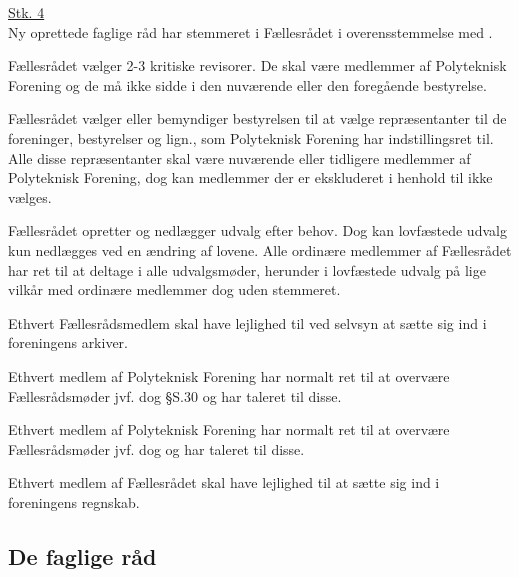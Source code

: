 \begin{list}
\underline{Stk. 4}\\
Ny oprettede faglige råd har stemmeret i Fællesrådet i overensstemmelse med .

\item Fællesrådet vælger 2-3 kritiske revisorer. De skal være medlemmer af Polyteknisk Forening og de må ikke sidde i den nuværende eller den foregående bestyrelse. 

\item Fællesrådet vælger eller bemyndiger bestyrelsen til at vælge repræsentanter til de foreninger, bestyrelser og lign., som Polyteknisk Forening har indstillingsret til. Alle disse repræsentanter skal være nuværende eller tidligere medlemmer af Polyteknisk Forening, dog kan medlemmer der er ekskluderet i henhold til  ikke vælges.

\item Fællesrådet opretter og nedlægger udvalg efter behov. Dog kan lovfæstede udvalg kun nedlægges ved en ændring af lovene. Alle ordinære medlemmer af Fællesrådet har ret til at deltage i alle udvalgsmøder, herunder i lovfæstede udvalg på lige vilkår med ordinære medlemmer dog uden stemmeret.

\item Ethvert Fællesrådsmedlem skal have lejlighed til ved selvsyn at sætte sig ind i foreningens arkiver.

\item Ethvert medlem af Polyteknisk Forening har normalt ret til at overvære Fællesrådsmøder jvf. dog §S.30 og har taleret til disse.

\item Ethvert medlem af Polyteknisk Forening har normalt ret til at overvære Fællesrådsmøder jvf. dog  og har taleret til disse.

\item Ethvert medlem af Fællesrådet skal have lejlighed til at sætte sig ind i foreningens regnskab.



\subsection{De faglige råd}
\label{L:kap:Faglige}


\end{list}
